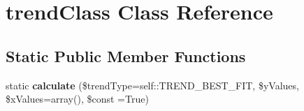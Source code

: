\section{trend\+Class Class Reference}
\label{classtrend_class}
\subsection*{Static Public Member Functions}
\begin{DoxyCompactItemize}
\item 
static {\bfseries calculate} (\$trend\+Type=self\+::\+T\+R\+E\+N\+D\+\_\+\+B\+E\+S\+T\+\_\+\+F\+I\+T, \$y\+Values, \$x\+Values=array(), \$const =True)\label{classtrend_class_a5feaf44cc290ddcf264d43ccf569c579}

\end{DoxyCompactItemize}
